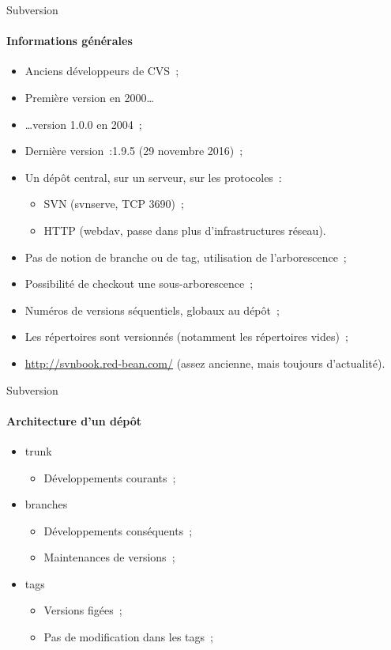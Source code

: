 \begin{frame}[fragile]{Subversion}
\framesubtitle{Informations générales}
\begin{itemize}[<+->]
 \item Anciens développeurs de CVS~;
 \item Première version en 2000\dots
 \item \dots version 1.0.0 en 2004~;
 \item Dernière version~:1.9.5 (29 novembre 2016)~;
 \item Un dépôt central, sur un serveur, sur les protocoles~:
 \begin{itemize}[<+->]
  \item SVN (svnserve, TCP 3690)~;
  \item HTTP (webdav, passe dans plus d'infrastructures réseau).
 \end{itemize}
 \item Pas de notion de branche ou de tag, utilisation de l'arborescence~;
 \item Possibilité de checkout une sous-arborescence~;
 \item Numéros de versions séquentiels, globaux au dépôt~;
 \item Les répertoires sont versionnés (notamment les répertoires vides)~;
 \item \url{http://svnbook.red-bean.com/} (assez ancienne, mais toujours d'actualité).
\end{itemize}
\end{frame}

\begin{frame}{Subversion}
\framesubtitle{Architecture d'un dépôt}
  \begin{itemize}[<+->]
   \item trunk
   \begin{itemize}[<+->]
    \item Développements courants~;
   \end{itemize}
   \item branches
   \begin{itemize}[<+->]
    \item Développements conséquents~;
    \item Maintenances de versions~;
   \end{itemize}
   \item tags
   \begin{itemize}[<+->]
    \item Versions figées~;
    \item Pas de modification dans les tags~;
   \end{itemize}
 \end{itemize}
\end{frame}

